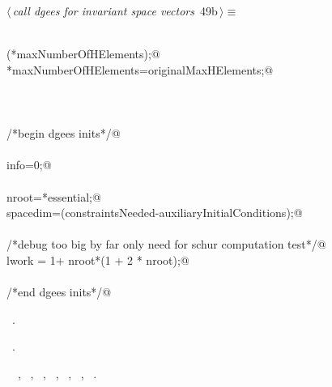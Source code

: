 \documentclass{article}
\begin{document}
\begin{flushleft} \small
\begin{minipage}{\linewidth}\label{scrap70}\raggedright\small
{} $\langle\,${\itshape call dgees for invariant space vectors}\nobreak\ {\footnotesize {49b}}$\,\rangle\equiv$
\vspace{-1ex}
\begin{list}{}{} \item
\mbox{}\verb@@\\
\mbox{}\verb@bumpSparseAim(*maxNumberOfHElements);@\\
\mbox{}\verb@*maxNumberOfHElements=originalMaxHElements;@\\
\mbox{}\verb@@\\
\mbox{}\verb@@\\
\mbox{}\verb@@\\
\mbox{}\verb@/*begin dgees inits*/@\\
\mbox{}\verb@@\\
\mbox{}\verb@   info=0;@\\
\mbox{}\verb@@\\
\mbox{}\verb@   nroot=*essential;@\\
\mbox{}\verb@    spacedim=(constraintsNeeded-auxiliaryInitialConditions);@\\
\mbox{}\verb@@\\
\mbox{}\verb@   /*debug too big by far only need for schur computation test*/@\\
\mbox{}\verb@   lwork =  1+  nroot*(1 + 2 * nroot);@\\
\mbox{}\verb@@\\
\mbox{}\verb@/*end dgees inits*/@\\
\mbox{}\verb@@{\NWsep}
\end{list}
\vspace{-1.5ex}
\footnotesize
\begin{list}{}{\setlength{\itemsep}{-\parsep}\setlength{\itemindent}{-\leftmargin}}
\item \NWtxtMacroDefBy\ .
\item \NWtxtMacroRefIn\ .
\item \NWtxtIdentsUsed\nobreak\  \verb@bumpSparseAim@\nobreak\ , \verb@essential@\nobreak\ , \verb@info@\nobreak\ , \verb@lwork@\nobreak\ , \verb@maxNumberOfHElements@\nobreak\ , \verb@nroot@\nobreak\ , \verb@spacedim@\nobreak\ .
\item{}
\end{list}
\end{minipage}\vspace{4ex}
\end{flushleft}
\end{document}
